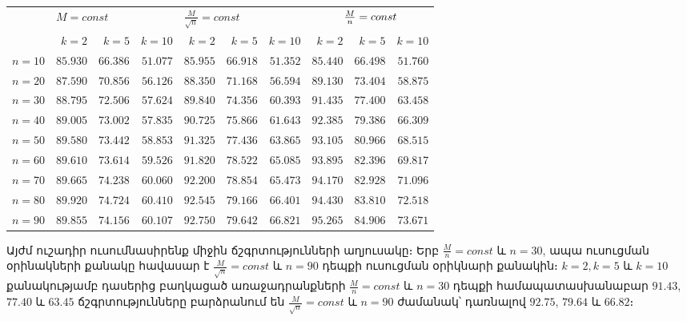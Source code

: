 \documentclass[12pt]{article}
\begin{document}
\begin{center}
\vspace{2mm}
\begin{tabular}{|l||r|r|r||r|r|r||r|r|r||}
 \cline{2-10}
  \multicolumn{1}{c|}{} & \multicolumn{3}{|l||}{\hspace{10mm} $M=const$} & \multicolumn{3}{|l||}{\hspace{10mm} $\frac{M}{\sqrt{n}} = const$ } & \multicolumn{3}{|l||}{$\hspace{10mm} \frac{M}{n} = const$} \\
 \cline{2-10}
  \multicolumn{1}{c|}{} &     $k=2$ &     $k=5$ &     $k=10$ &    $k=2$ &     $k=5$ &     $k=10$ &    $k=2$ &     $k=5$ &     $k=10$ \\
\hline
$n=10$                  & $85.930$ & $66.386$ & $51.077$ & $85.955$ & $66.918$ & $51.352$ & $85.440$ & $66.498$ & $51.760$ \\
\hline
$n=20$                 & $87.590$ & $70.856$ & $56.126$ & $88.350$ & $71.168$ & $56.594$ & $89.130$ & $73.404$ & $58.875$ \\
\hline
$n=30$                 & $88.795$ & $72.506$ & $57.624$ & $89.840$ & $74.356$ & $60.393$ & $91.435$ & $77.400$ & $63.458$ \\
\hline
$n=40$                 & $89.005$ & $73.002$ & $57.835$ & $90.725$ & $75.866$ & $61.643$ & $92.385$ & $79.386$ & $66.309$ \\
\hline
$n=50$                 & $89.580$ & $73.442$ & $58.853$ & $91.325$ & $77.436$ & $63.865$ & $93.105$ & $80.966$ & $68.515$ \\
\hline
$n=60$                 & $89.610$ & $73.614$ & $59.526$ & $91.820$ & $78.522$ & $65.085$ & $93.895$ & $82.396$ & $69.817$ \\
\hline
$n=70$                 & $89.665$ & $74.238$ & $60.060$ & $92.200$ & $78.854$ & $65.473$ & $94.170$ & $82.928$ & $71.096$ \\
\hline
$n=80$                 & $89.920$ & $74.724$ & $60.410$ & $92.545$ & $79.166$ & $66.401$ & $94.430$ & $83.810$ & $72.518$ \\
\hline
$n=90$                 & $89.855$ & $74.156$ & $60.107$ & $92.750$ & $79.642$ & $66.821$ & $95.265$ & $84.906$ & $73.671$ \\
\hline
\end{tabular}
\end{center}
\vspace{3mm}
\par Այժմ ուշադիր ուսումնասիրենք միջին ճշգրտությունների աղյուսակը։ Երբ  $\frac{M}{n}=const$ և $n=30$, ապա ուսուցման օրինակների քանակը հավասար է $\frac{M}{\sqrt{n}}=const$ և $n=90$ դեպքի ուսուցման օրիկնարի քանակին։ $k=2, k=5$ և $k=10$ քանակությամբ դասերից բաղկացած առաջադրանքների $\frac{M}{n}=const$ և $n=30$  դեպքի համապատասխանաբար $91.43$, $77.40$ և $63.45$ ճշգրտությունները բարձրանում  են  $\frac{M}{\sqrt{n}}=const$ և $n=90$ ժամանակ՝ դառնալով $92.75$, $79.64$ և $66.82$։
\end{document}

